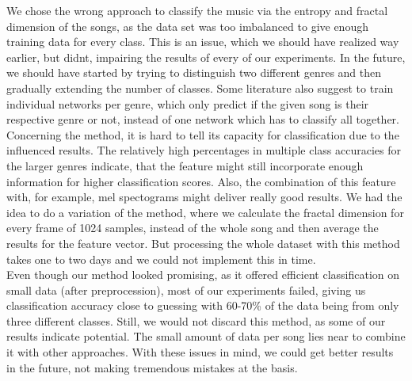 We chose the wrong approach to classify the music via the entropy and
fractal dimension of the songs, as the data set was too imbalanced to
give enough training data for every class. This is an issue, which we
should have realized way earlier, but didnt, impairing the results of
every of our experiments. In the future, we should have started by
trying to distinguish two different genres and then gradually
extending the number of classes. Some literature also suggest to
train individual networks per genre, which only predict if the given
song is their respective genre or not, instead of one network which
has to classify all together.\\
Concerning the method, it is hard to tell its capacity for
classification due to the influenced results. The relatively high
percentages in multiple class accuracies for the larger genres indicate,
that the feature might still incorporate enough information for higher
classification scores. Also, the combination of this feature with, for
example, mel spectograms might deliver really good results. We had the
idea to do a variation of the method, where we calculate the fractal
dimension for every frame of 1024 samples, instead of the whole song and
then average the results for the feature vector. But processing the
whole dataset with this method takes one to two days and we could not
implement this in time.\\
Even though our method looked promising, as it offered efficient
classification on small data (after preprocession), most of our
experiments failed, giving us classification accuracy close to guessing
with 60-70\% of the data being from only three different classes. Still,
we would not discard this method, as some of our results indicate
potential. The small amount of data per song lies near to combine it
with other approaches. With these issues in mind, we could get better
results in the future, not making tremendous mistakes at the basis.
